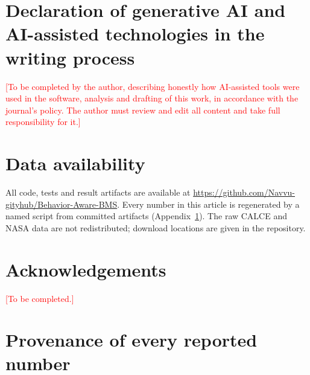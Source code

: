 \documentclass[preprint,12pt,authoryear]{elsarticle}
\begin{document}
\section*{Declaration of generative AI and AI-assisted technologies in the
writing process}
\textcolor{red}{[To be completed by the author, describing honestly how
AI-assisted tools were used in the software, analysis and drafting of this
work, in accordance with the journal's policy. The author must review and edit
all content and take full responsibility for it.]}

\section*{Data availability}
All code, tests and result artifacts are available at
\url{https://github.com/Navvu-gityhub/Behavior-Aware-BMS}. Every number in
this article is regenerated by a named script from committed artifacts
(Appendix~\ref{app:artifacts}). The raw CALCE and NASA data are not
redistributed; download locations are given in the repository.

\section*{Acknowledgements}
\textcolor{red}{[To be completed.]}

\appendix
\section{Provenance of every reported number}
\label{app:artifacts}
\end{document}
